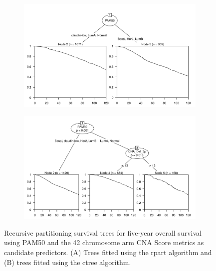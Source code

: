 \begin{figure}[!htb]
\centering

\vspace{0.5cm}

\begin{subfigure}{\textwidth}
\subcaption{}
\includegraphics[width=1\textwidth]{../figures/Appendices/Appendix_B/PA_PartyKit_Survival_Score_TenYearOS_PAM50.png}
\end{subfigure}

\vspace{2cm}

\begin{subfigure}{\textwidth}
\subcaption{}
\includegraphics[width=1\textwidth]{../figures/Appendices/Appendix_B/PA_Ctree_Survival_Score_TenYearOS_PAM50.png}
\end{subfigure}

\vspace{0.5cm}

\caption[Recursive partitioning survival trees for five-year overall survival using PAM50 and the 42 chromosome arm CNA Score metrics as candidate predictors.]{Recursive partitioning survival trees for five-year overall survival using PAM50 and the 42 chromosome arm CNA Score metrics as candidate predictors. (A) Trees fitted using the rpart algorithm and (B) trees fitted using the ctree algorithm.}
\end{figure}

